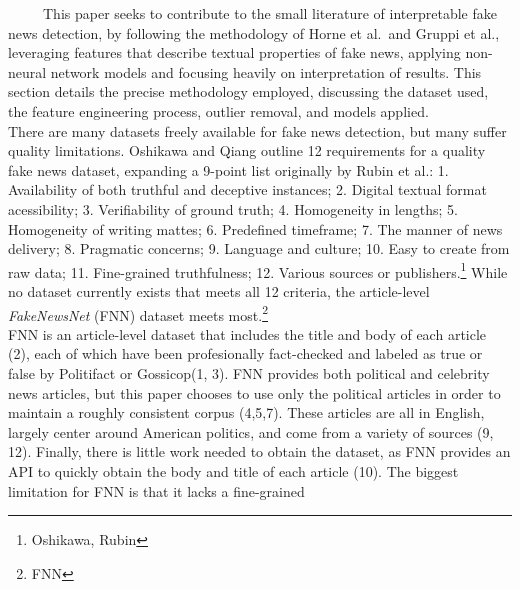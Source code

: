 \documentclass[12pt]{article}
\begin{document}
~~~~~This paper seeks to contribute to the small literature of
interpretable fake news detection, by following the methodology of Horne
et al.~and Gruppi et al., leveraging features that describe textual
properties of fake news, applying non-neural network models and focusing
heavily on interpretation of results. This section details the precise
methodology employed, discussing the dataset used, the feature
engineering process, outlier removal, and models applied.\\
\hspace*{0.333em}\hspace*{0.333em}\hspace*{0.333em}\hspace*{0.333em}\hspace*{0.333em}There
are many datasets freely available for fake news detection, but many
suffer quality limitations. Oshikawa and Qiang outline 12 requirements
for a quality fake news dataset, expanding a 9-point list originally by
Rubin et al.: 1. Availability of both truthful and deceptive instances;
2. Digital textual format acessibility; 3. Verifiability of ground
truth; 4. Homogeneity in lengths; 5. Homogeneity of writing mattes; 6.
Predefined timeframe; 7. The manner of news delivery; 8. Pragmatic
concerns; 9. Language and culture; 10. Easy to create from raw data; 11.
Fine-grained truthfulness; 12. Various sources or publishers.\footnote{Oshikawa,
  Rubin} While no dataset currently exists that meets all 12 criteria,
the article-level \emph{FakeNewsNet} (FNN) dataset meets most.\footnote{FNN}\\
\hspace*{0.333em}\hspace*{0.333em}\hspace*{0.333em}\hspace*{0.333em}\hspace*{0.333em}FNN
is an article-level dataset that includes the title and body of each
article (2), each of which have been profesionally fact-checked and
labeled as true or false by Politifact or Gossicop(1, 3). FNN provides
both political and celebrity news articles, but this paper chooses to
use only the political articles in order to maintain a roughly
consistent corpus (4,5,7). These articles are all in English, largely
center around American politics, and come from a variety of sources (9,
12). Finally, there is little work needed to obtain the dataset, as FNN
provides an API to quickly obtain the body and title of each article
(10). The biggest limitation for FNN is that it lacks a fine-grained
\end{document}
